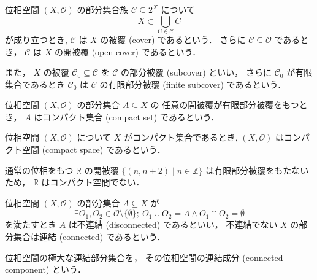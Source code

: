 \documentclass[titlepage]{ltjsreport}
\begin{document}
\begin{definition}
  位相空間 $(X,\mathcal{O})$ の部分集合族 $\mathcal{C}\subseteq2^X$ について
  \begin{equation}
    X\subset\bigcup_{C\in\mathcal{C}}C
  \end{equation}
  が成り立つとき,
  $\mathcal{C}$ は $X$ の被覆 (cover) であるという．
  さらに $\mathcal{C}\subseteq\mathcal{O}$ であるとき，
  $\mathcal{C}$ は $X$ の開被覆 (open cover) であるという．

  また，
  $X$ の被覆 $\mathcal{C}_0\subseteq\mathcal{C}$ を
  $\mathcal{C}$ の部分被覆 (subcover) といい，
  さらに $\mathcal{C}_0$ が有限集合であるとき
  $\mathcal{C}_0$ は $\mathcal{C}$ の有限部分被覆 (finite subcover) であるという．
\end{definition}

\begin{definition}[コンパクト集合]
  位相空間 $(X,\mathcal{O})$ の部分集合 $A\subseteq X$ の
  任意の開被覆が有限部分被覆をもつとき，
  $A$ はコンパクト集合 (compact set) であるという．
\end{definition}

\begin{definition}[コンパクト空間]
  位相空間 $(X,\mathcal{O})$ について $X$ がコンパクト集合であるとき,
  $(X,\mathcal{O})$ はコンパクト空間 (compact space) であるという．
\end{definition}

\begin{example}
  通常の位相をもつ
  $\mathbb{R}$
  の開被覆
  $\{(n,n+2)\mid n\in\mathbb{Z}\}$
  は有限部分被覆をもたないため，
  $\mathbb{R}$
  はコンパクト空間でない．
\end{example}

\begin{definition}[連結，不連結]
  位相空間 $(X,\mathcal{O})$ の部分集合 $A\subseteq X$ が
  \begin{equation}
    \exists O_1,O_2\in\mathcal{O}\setminus\{\emptyset\};
    \ O_1\cup O_2=A\wedge O_1\cap O_2=\emptyset
  \end{equation}
  を満たすとき $A$ は不連結 (disconnected) であるといい，
  不連結でない $X$ の部分集合は連結 (connected) であるという．
\end{definition}

\begin{definition}[連結成分]
  位相空間の極大な連結部分集合を，
  その位相空間の連結成分 (connected component) という．
\end{definition}
\end{document}

